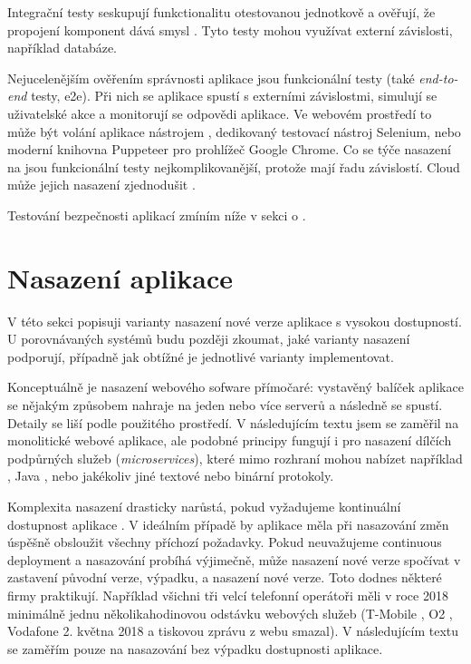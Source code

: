         Integrační testy seskupují funkctionalitu otestovanou jednotkově a ověřují, že propojení komponent dává smysl \cite{integration-tests}. Tyto testy mohou využívat externí závislosti, například databáze.

        Nejucelenějším ověřením správnosti aplikace jsou funkcionální testy (také \textit{end-to-end} testy, e2e). Při nich se aplikace spustí s externími závislostmi, simulují se uživatelské akce a monitorují se odpovědi aplikace. Ve webovém prostředí to může být volání aplikace nástrojem , dedikovaný testovací nástroj Selenium, nebo moderní knihovna Puppeteer pro prohlížeč Google Chrome. Co se týče nasazení na \CI jsou funkcionální testy nejkomplikovanější, protože mají řadu závislostí. Cloud může jejich nasazení zjednodušit \cite{gcp-headless}.


        Testování bezpečnosti aplikací zmíním níže v sekci o .

    \section*{Nasazení aplikace}
        V této sekci popisuji varianty nasazení nové verze aplikace s vysokou dostupností. U porovnávaných \CICD systémů budu později zkoumat, jaké varianty nasazení podporují, případně jak obtížné je jednotlivé varianty implementovat.

        Konceptuálně je nasazení webového sofware přímočaré: vystavěný balíček aplikace se nějakým způsobem nahraje na jeden nebo více serverů a následně se spustí. Detaily se liší podle použitého prostředí. V následujícím textu jsem se zaměřil na monolitické webové aplikace, ale podobné principy fungují i pro nasazení dílčích podpůrných služeb (\textit{microservices}), které mimo \HTTP rozhraní mohou nabízet například , Java , nebo jakékoliv jiné textové nebo binární protokoly.

        Komplexita nasazení drasticky narůstá, pokud vyžadujeme kontinuální dostupnost aplikace \cite{beyer2016site}. V ideálním případě by aplikace měla při nasazování změn úspěšně obsloužit všechny příchozí požadavky. Pokud neuvažujeme continuous deployment a nasazování probíhá výjimečně, může nasazení nové verze spočívat v zastavení původní verze, výpadku, a nasazení nové verze. Toto dodnes některé firmy praktikují. Například všichni tři velcí telefonní operátoři měli v roce 2018 minimálně jednu několikahodinovou odstávku webových služeb (T-Mobile \cite{tmobile-odstavka}, O2 \cite{o2-odstavka}, Vodafone 2. května 2018 a tiskovou zprávu z webu smazal). V následujícím textu se zaměřím pouze na nasazování bez výpadku dostupnosti aplikace.

